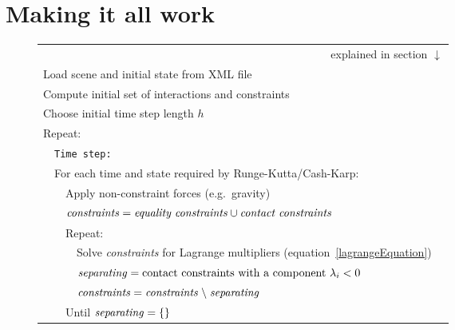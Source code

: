 \section{Making it all work\label{implementation}}

\begin{figure}
\renewcommand{\baselinestretch}{1.3}\small\normalsize
\newcommand{\spx}{\vspace*{\baselineskip}\\}
\begin{tabular}{|l|l|l|l|@{}l}
\multicolumn{5}{r}{explained in section $\downarrow$}\\\cline{1-4}
\multicolumn{4}{|l|}{Load scene and initial state from XML file}&\hspace*{0.5cm}\\\cline{1-4}
\multicolumn{4}{|l|}{Compute initial set of interactions and constraints}\\\cline{1-4}
\multicolumn{4}{|l|}{Choose initial time step length $h$}\\\cline{1-4}
\multicolumn{4}{|l|}{Repeat:}\\\cline{2-4}
    &\multicolumn{3}{|l|}{\texttt{Time step:}}\\\cline{2-4}
    &\multicolumn{3}{|l|}{For each time and state required by Runge-Kutta/Cash-Karp:}\\\cline{3-4}
        &&\multicolumn{2}{|l|}{Apply non-constraint forces (e.g.\ gravity)}\\\cline{3-4}
        &&\multicolumn{2}{|l|}{$\mbox{\textit{constraints}} = \mbox{\textit{equality constraints}}
        \cup \mbox{\textit{contact constraints}}$}\\\cline{3-4}
        &&\multicolumn{2}{|l|}{Repeat:}\\\cline{4-4}
            &&&Solve \textit{constraints} for Lagrange multipliers (equation~\ref{lagrangeEquation})\\\cline{4-4}
            &&&$\mbox{\textit{separating}} = \mbox{contact constraints with a component } \lambda_i < 0$&
            \zerobox{b}{\mbox{$\left\}\ref{restingContact}\begin{array}{l}
            \spx\spx\spx\spx\spx\spx\spx\end{array}\right.$}}\\\cline{4-4}
            &&&$\mbox{\textit{constraints}} = \mbox{\textit{constraints}} \;\backslash\;
            \mbox{\textit{separating}}$\\\cline{4-4}
        &&\multicolumn{2}{|l|}{Until $\mbox{\textit{separating}} = \{\}$}\\\cline{3-4}

\end{tabular}
\end{figure}
